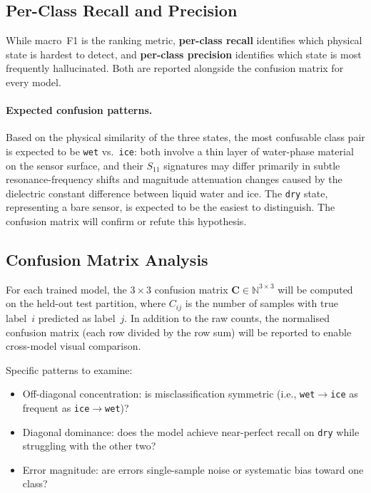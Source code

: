 \subsection{Per-Class Recall and Precision}
\label{subsec:perclass}

While macro~F1 is the ranking metric, \textbf{per-class recall}
identifies which physical state is hardest to detect, and
\textbf{per-class precision} identifies which state is most frequently
hallucinated.  Both are reported alongside the confusion matrix for
every model.

\paragraph{Expected confusion patterns.}
Based on the physical similarity of the three states, the most
confusable class pair is expected to be \texttt{wet} vs.\
\texttt{ice}: both involve a thin layer of water-phase material on
the sensor surface, and their $S_{11}$ signatures may differ primarily
in subtle resonance-frequency shifts and magnitude attenuation changes
caused by the dielectric constant difference between liquid water and
ice.  The \texttt{dry} state, representing a bare sensor, is expected
to be the easiest to distinguish.  The confusion matrix will confirm
or refute this hypothesis.


\subsection{Confusion Matrix Analysis}
\label{subsec:confusion}

For each trained model, the $3 \times 3$ confusion matrix
$\mathbf{C} \in \mathbb{N}^{3 \times 3}$ will be computed on the
held-out test partition, where $C_{ij}$ is the number of samples
with true label~$i$ predicted as label~$j$.  In addition to the raw
counts, the normalised confusion matrix (each row divided by the row
sum) will be reported to enable cross-model visual comparison.

Specific patterns to examine:
%
\begin{itemize}
  \item Off-diagonal concentration: is misclassification symmetric
        (i.e., \texttt{wet}$\to$\texttt{ice} as frequent as
        \texttt{ice}$\to$\texttt{wet})?
  \item Diagonal dominance: does the model achieve near-perfect
        recall on \texttt{dry} while struggling with the other two?
  \item Error magnitude: are errors single-sample noise or
        systematic bias toward one class?
\end{itemize}


